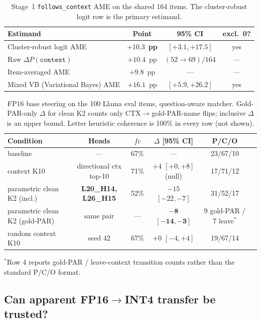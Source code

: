 \documentclass{article} %
\begin{document}
\begin{table}[t]
\caption{Stage~1 \texttt{follows\_context} AME on the shared 164 items. The cluster-robust logit row is the primary estimand.}
\label{tab:ame}
\centering
\small
\begin{tabular}{lccc}
\toprule
Estimand & Point & 95\% CI & excl.\ 0? \\
\midrule
Cluster-robust logit AME & $\mathbf{+10.3}$~\textbf{pp} & $\mathbf{[+3.1, +17.5]}$ & yes \\
Raw $\Delta P(\texttt{context})$ & $+10.4$~pp & $(52{\to}69)/164$ & --- \\
Item-averaged AME & $+9.8$~pp & --- & --- \\
Mixed VB (Variational Bayes) AME & $+16.1$~pp & $[+5.9, +26.2]$ & yes \\
\bottomrule
\end{tabular}
\end{table}

\begin{table}[t]
\caption{FP16 base steering on the 100 Llama eval items, question-aware matcher. Gold-PAR-only $\Delta$ for clean K2 counts only CTX$\to$gold-PAR-name flips; inclusive $\Delta$ is an upper bound. Letter heuristic coherence is 100\% in every row (not shown).}
\label{tab:fp16-gate}
\centering
\footnotesize
\setlength{\tabcolsep}{3pt}
\begin{tabular}{lccccc}
\toprule
Condition & Heads & $fc$ & $\Delta$ [95\% CI] & P/C/O \\
\midrule
baseline & --- & 67\% & --- & 23/67/10 \\
context K10 & directional ctx top-10 & 71\% & $+4$ $[+0,+8]$ (null) & 17/71/12 \\
parametric clean K2 (incl.) & \textbf{L20\_H14, L26\_H15} & 52\% & $-15$ $[-22,-7]$ & 31/52/17 \\
parametric clean K2 (gold-PAR) & same pair & --- & $\mathbf{-8}$ $\mathbf{[-14,-3]}$ & 9 gold-PAR / 7 leave$^*$ \\
random context K10 & seed 42 & 67\% & $+0$ $[-4,+4]$ & 19/67/14 \\
\bottomrule
\end{tabular}
\par\vspace{1pt}\raggedright\tiny $^*$Row 4 reports gold-PAR / leave-context transition counts rather than the standard P/C/O format.
\end{table}

\subsection{Can apparent FP16$\to$INT4 transfer be trusted?}
\label{sec:ctx-transfer}
\end{document}
